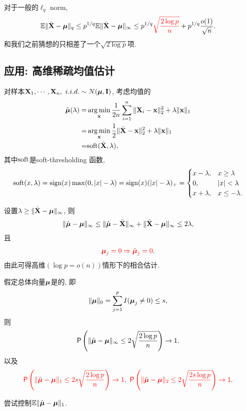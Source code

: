 对于一般的$\ell_q$ norm, 	
\begin{align*}
	\mathbb{E} \|\bar{{\bf X}}-\mbox{\boldmath $\mu$}\|_q \leq p^{1/q}	\mathbb{E} \|\bar{{\bf X}}-\mbox{\boldmath $\mu$}\|_\infty \leq p^{1/q} \textcolor{red}{\sqrt{\frac{2 \log p}{n}}}+p^{1/q} \frac{o(1)}{\sqrt{n}}.
\end{align*}
和我们之前猜想的只相差了一个$\sqrt{2 \log p}$项.
\subsection{应用: 高维稀疏均值估计}
对样本${\bf X}_1,\cdots, {\bf X}_n,~i.i.d.\sim N(\mbox{\boldmath $\mu$}, {\bf I})$, 考虑均值的
\begin{align*}
	\hat{\mbox{\boldmath $\mu$}}(\lambda)=&\operatorname*{arg\,min}_{{\bf x}} \frac{1}{2n}\sum_{i=1}^n \|{\bf X}_i-{\bf x}\|_2^2+\lambda \|{\bf x}\|_1\\
	=&\operatorname*{arg\,min}_{{\bf x}} \frac{1}{2}\|\bar{{\bf X}}-{\bf x}\|_2^2+\lambda \|{\bf x}\|_1\\
	=&\mbox{soft}(\bar{{\bf X}},\lambda),
\end{align*}
其中$\mbox{soft}$是soft-thresholding 函数, 
\begin{align*}
	\mbox{soft}(x,\lambda)=\mbox{sign}(x)\max(0,|x|-\lambda)=\mbox{sign}(x)(|x|-\lambda)_{+}=\begin{cases}
		x-\lambda, & x \geq \lambda\\
		0,& |x|<\lambda\\
		x+\lambda, & x\leq -\lambda.
	\end{cases}
\end{align*}

设置$\lambda\geq \|\bar{{\bf X}}-\mbox{\boldmath $\mu$}\|_\infty$, 则
\begin{align*}
	\|\hat{\mbox{\boldmath $\mu$}}-\mbox{\boldmath $\mu$}\|_\infty \leq \|\hat{\mbox{\boldmath $\mu$}}-\bar{{\bf X}}\|_\infty  +\|\bar{{\bf X}}-\mbox{\boldmath $\mu$}\|_\infty\leq 2\lambda,
\end{align*}
且
\begin{align*}
	\textcolor{red}{\mbox{\boldmath $\mu$}_j=0 \Rightarrow \hat{\mbox{\boldmath $\mu$}}_j=0}.
\end{align*}
由此可得高维$(\log p =o(n))$情形下的相合估计. 
\begin{prop}[严格稀疏]
假定总体向量$\mbox{\boldmath $\mu$}$是的, 即
\begin{align*}
	\|\mbox{\boldmath $\mu$}\|_0 =\sum_{j=1}^p I(\mbox{\boldmath $\mu$}_j \neq 0) \leq s,
\end{align*}	
则
\begin{align*}
	\textsf{P}\left(\|\hat{\mbox{\boldmath $\mu$}}-\mbox{\boldmath $\mu$}\|_\infty\leq 2\sqrt{\frac{2\log p}{n}}\right) \to 1.
\end{align*}
以及
\begin{align*}
	\textcolor{red}{\textsf{P}\left(\|\hat{\mbox{\boldmath $\mu$}}-\mbox{\boldmath $\mu$}\|_1 \leq 2s\sqrt{\frac{2\log p}{n}}\right) \to 1,~\textsf{P}\left(\|\hat{\mbox{\boldmath $\mu$}}-\mbox{\boldmath $\mu$}\|_2 \leq 2\sqrt{\frac{2s\log p}{n}}\right) \to 1}.
\end{align*}
\end{prop}
\begin{ques}
	尝试控制$\mathbb{E} \|\hat{\mbox{\boldmath $\mu$}}-\mbox{\boldmath $\mu$}\|_1$.
\end{ques}

